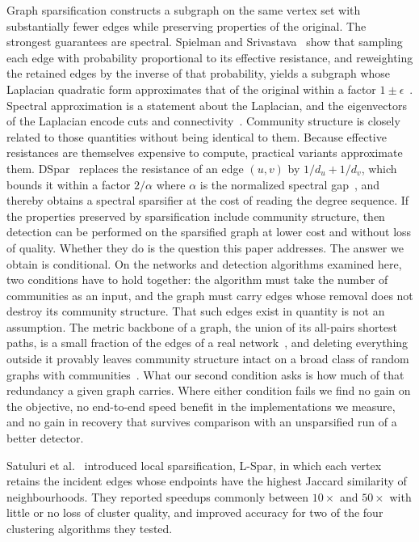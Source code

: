 Graph sparsification constructs a subgraph on the same vertex set with
substantially fewer edges while preserving properties of the original. The
strongest guarantees are spectral. Spielman and
Srivastava~\cite{spielman2008graph} show that sampling each edge with probability
proportional to its effective resistance, and reweighting the retained edges by
the inverse of that probability, yields a subgraph whose Laplacian quadratic form
approximates that of the original within a factor $1 \pm
\epsilon$~\cite{benczur2015randomized, spielman2014nearly}. Spectral
approximation is a statement about the Laplacian, and the eigenvectors of the
Laplacian encode cuts and connectivity~\cite{von2007tutorial,
shi2000normalized}. Community structure is closely related to those quantities
without being identical to them. Because effective resistances are themselves
expensive to compute, practical variants approximate them.
DSpar~\cite{liu2023dspar} replaces the resistance of an edge $(u,v)$ by
$1/d_u + 1/d_v$, which bounds it within a factor $2/\alpha$ where $\alpha$ is the
normalized spectral gap~\cite{lovasz1993random}, and thereby obtains a spectral
sparsifier at the cost of reading the degree sequence. If the properties
preserved by sparsification include community structure, then detection can be
performed on the sparsified graph at lower cost and without loss of quality.
Whether they do is the question this paper addresses. The answer we obtain is
conditional. On the networks and detection algorithms examined here, two
conditions have to hold together: the
algorithm must take the number of communities as an input, and the graph must
carry edges whose removal does not destroy its community structure. That such
edges exist in quantity is not an assumption. The metric backbone of a graph, the
union of its all-pairs shortest paths, is a small fraction of the edges of a real
network~\cite{correia2023contact}, and deleting everything outside it provably
leaves community structure intact on a broad class of random graphs with
communities~\cite{dreveton2024metric}. What our second condition asks is how much
of that redundancy a given graph carries. Where either
condition fails we find no gain on the objective, no end-to-end speed benefit in
the implementations we measure, and no gain in recovery that survives comparison
with an unsparsified run of a better detector.


Satuluri et al.~\cite{satuluri2011local} introduced local sparsification,
L-Spar, in which each vertex retains the incident edges whose endpoints have the
highest Jaccard similarity of neighbourhoods. They reported speedups
commonly between $10\times$ and $50\times$ with little or no loss of cluster
quality, and improved accuracy for two of the four clustering algorithms they
tested.

